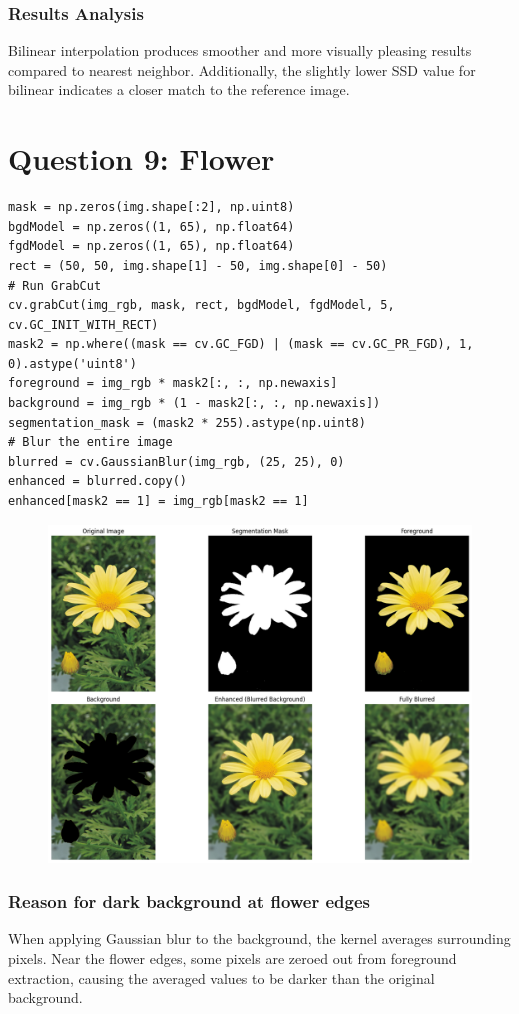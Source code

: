 \documentclass[11pt]{article}
\begin{document}
\subsubsection*{Results Analysis}
Bilinear interpolation produces smoother and more visually pleasing results compared to nearest neighbor. Additionally, the slightly lower SSD value for bilinear indicates a closer match to the reference image.


\section*{Question 9: Flower}
\begin{lstlisting}[style=pythonstyle]
mask = np.zeros(img.shape[:2], np.uint8)
bgdModel = np.zeros((1, 65), np.float64)
fgdModel = np.zeros((1, 65), np.float64)
rect = (50, 50, img.shape[1] - 50, img.shape[0] - 50)
# Run GrabCut
cv.grabCut(img_rgb, mask, rect, bgdModel, fgdModel, 5, cv.GC_INIT_WITH_RECT)
mask2 = np.where((mask == cv.GC_FGD) | (mask == cv.GC_PR_FGD), 1, 0).astype('uint8')
foreground = img_rgb * mask2[:, :, np.newaxis]
background = img_rgb * (1 - mask2[:, :, np.newaxis])
segmentation_mask = (mask2 * 255).astype(np.uint8)
# Blur the entire image
blurred = cv.GaussianBlur(img_rgb, (25, 25), 0)
enhanced = blurred.copy()
enhanced[mask2 == 1] = img_rgb[mask2 == 1]
\end{lstlisting}

\begin{figure}[H]
    \centering
    \includegraphics[width=0.8\linewidth]{resources/q9.png}
    \label{fig:placeholder}
\end{figure}
\subsubsection*{Reason for dark background at flower edges}
When applying Gaussian blur to the background, the kernel averages surrounding pixels. Near the flower edges, some pixels are zeroed out from foreground extraction, causing the averaged values to be darker than the original background.

% 
% 
\end{document}
